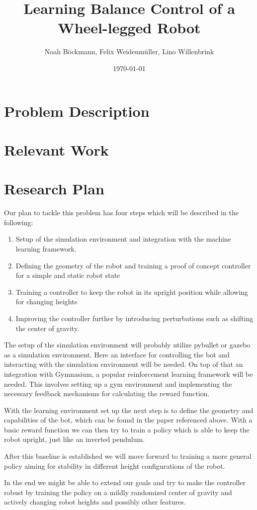 \documentclass[a4paper]{article}
\title{Learning Balance Control of a Wheel-legged Robot}
\author{Noah Böckmann, Felix Weidenmüller, Lino Willenbrink}
\date{\today}
\begin{document}
\maketitle
\section{Problem Description}


\section{Relevant Work}

\section{Research Plan}
Our plan to tackle this problem has four steps which will be described in the following:
\begin{enumerate}
  \item Setup of the simulation environment and integration with the machine learning framework.
  \item Defining the geometry of the robot and training a proof of concept controller for a simple
        and static robot state
  \item Training a controller to keep the robot in its upright position while allowing for changing heights
  \item Improving the controller further by introducing perturbations such as shifting the center of
        gravity.
\end{enumerate}

The setup of the simulation environment will probably utilize pybullet or gazebo as a simulation
environment. Here an interface for controlling the bot and interacting with the simulation environment
will be needed. On top of that an integration with Gymnasium, a popular reinforcement learning
framework will be needed. This involves setting up a gym environment and implementing the necessary
feedback mechanisms for calculating the reward function.

With the learning environment set up the next step is to define the geometry and capabilities of the
bot, which can be found in the paper referenced above. With a basic reward function we can then try
to train a policy which is able to keep the robot upright, just like an inverted pendulum.

After this baseline is established we will move forward to training a more general policy aiming for
stability in different height configurations of the robot.

In the end we might be able to extend our goals and try to make the controller robust by training
the policy on a mildly randomized center of gravity and actively changing robot heights and possibly
other features.
\end{document}
